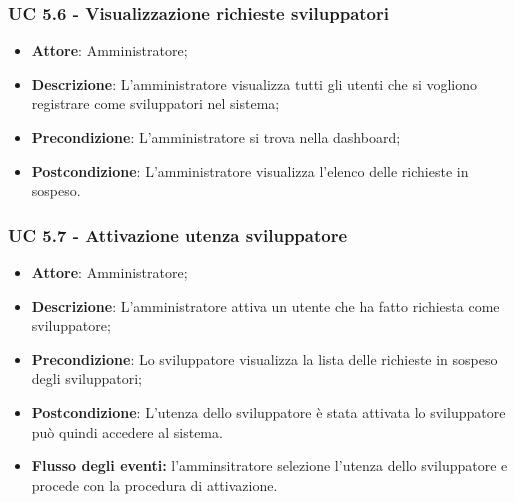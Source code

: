 \subsubsection{UC 5.6 - Visualizzazione richieste sviluppatori}
\begin{itemize}
\item \textbf{Attore}: Amministratore;
\item \textbf{Descrizione}: L'amministratore visualizza tutti gli utenti che si vogliono registrare come sviluppatori nel sistema;
\item \textbf{Precondizione}: L'amministratore si trova nella dashboard;
\item \textbf{Postcondizione}: L'amministratore visualizza l'elenco delle richieste in sospeso.
\end{itemize}

\subsubsection{UC 5.7 - Attivazione utenza sviluppatore}
\begin{itemize}
\item \textbf{Attore}: Amministratore;
\item \textbf{Descrizione}: L'amministratore attiva un utente che ha fatto richiesta come sviluppatore;
\item \textbf{Precondizione}: Lo sviluppatore visualizza la lista delle richieste in sospeso degli sviluppatori;
\item \textbf{Postcondizione}: L'utenza dello sviluppatore è stata attivata lo sviluppatore può quindi accedere al sistema.
\item \textbf{Flusso degli eventi:} l'amminsitratore selezione l'utenza dello sviluppatore e procede con la procedura di attivazione.
\end{itemize}


